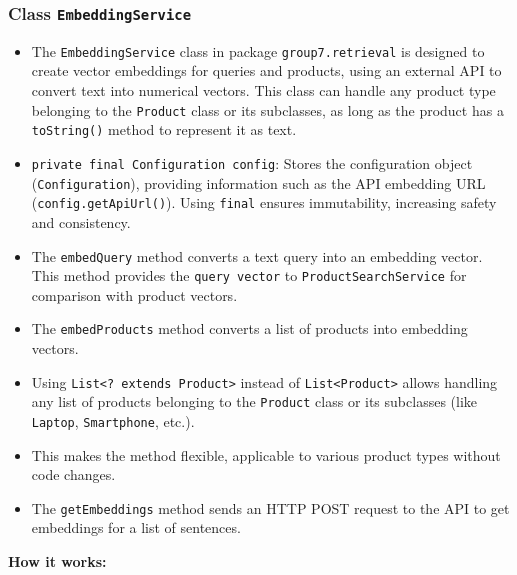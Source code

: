 \documentclass{article}
\begin{document}
\subsubsection{Class \texttt{EmbeddingService}}
\begin{itemize}
    \item The \texttt{EmbeddingService} class in package \texttt{group7.retrieval} is designed to create vector embeddings for queries and products, using an external API to convert text into numerical vectors. This class can handle any product type belonging to the \texttt{Product} class or its subclasses, as long as the product has a \texttt{toString()} method to represent it as text.
    \item \texttt{private final Configuration config}: Stores the configuration object (\texttt{Configuration}), providing information such as the API embedding URL (\texttt{config.getApiUrl()}). Using \texttt{final} ensures immutability, increasing safety and consistency.
    \item The \texttt{embedQuery} method converts a text query into an embedding vector. This method provides the \texttt{query vector} to \texttt{ProductSearchService} for comparison with product vectors.
    \item The \texttt{embedProducts} method converts a list of products into embedding vectors.
    \item Using \texttt{List<? extends Product>} instead of \texttt{List<Product>} allows handling any list of products belonging to the \texttt{Product} class or its subclasses (like \texttt{Laptop}, \texttt{Smartphone}, etc.).
    \item This makes the method flexible, applicable to various product types without code changes.
    \item The \texttt{getEmbeddings} method sends an HTTP POST request to the API to get embeddings for a list of sentences.
\end{itemize}
\textbf{How it works:}
\end{document}
